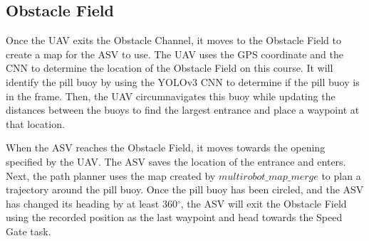 \documentclass[letterpaper, 12 pt, conference]{ieeeconf}
\begin{document}
\subsection{Obstacle Field}
\label{ObstacleField}
% 
Once the UAV exits the Obstacle Channel, it moves to the Obstacle Field to create a map for the ASV to use. The UAV uses the GPS coordinate and the CNN to determine the location of the Obstacle Field on this course. It will identify the pill buoy by using the YOLOv3 CNN to determine if the pill buoy is in the frame. Then, the UAV circumnavigates this buoy while updating the distances between the buoys to find the largest entrance and place a waypoint at that location. 

When the ASV reaches the Obstacle Field, it moves towards the opening specified by the UAV. The ASV saves the location of the entrance and enters. Next, the path planner uses the map created by $multirobot\_map\_merge$ to plan a trajectory around the pill buoy. Once the pill buoy has been circled, and the ASV has changed its heading by at least 360$^\circ$, the ASV will exit the Obstacle Field using the recorded position as the last waypoint and head towards the Speed Gate task. 
% 
\end{document}
